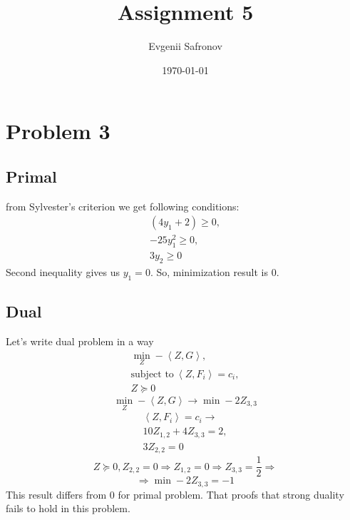 \documentclass[a4paper,11pt]{scrartcl}
\title{Assignment 5}
\author{Evgenii Safronov}
\date{\today}
\begin{document}
\maketitle
\section{Problem 3}

\subsection{Primal}

from Sylvester's criterion we get following conditions:
\begin{gather*}
(4y_1 +2 ) \geq 0, \\
-25y_1^2 \geq 0, \\
3y_2 \geq 0
\end{gather*}
Second inequality gives us $y_1 = 0$. So, minimization result is $0$.
\subsection{Dual}
Let's write dual problem in a way 
\begin{gather*}
\min_Z -\left< Z, G \right>, \\
\text{subject to}~ \left<Z,F_i \right> = c_i, \\
Z \succeq 0 
\end{gather*}
$$\min_Z -\left<Z,G \right> \rightarrow \min -2 Z_{3,3} $$
\begin{gather*}
\left<Z,F_i \right> = c_i \rightarrow \\
10 Z_{1,2} + 4 Z_{3,3} = 2, \\
3 Z_{2,2} = 0
\end{gather*}
$$Z \succeq 0, Z_{2,2} = 0 \Rightarrow Z_{1,2} = 0 \Rightarrow Z_{3,3} = \frac{1}{2} \Rightarrow $$
$$ \Rightarrow \min -2 Z_{3,3} = -1 $$
This result differs from $0$ for primal problem. That proofs that strong duality fails to hold in this problem.
\end{document}
